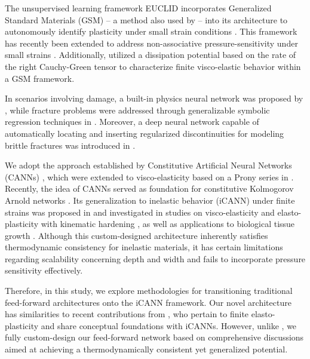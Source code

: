 The unsupervised learning framework EUCLID incorporates Generalized Standard Materials (GSM) -- a method also used by \cite{Flaschel2024convex} -- into its architecture to autonomously identify plasticity under small strain conditions \cite{flaschel2022,flaschel2023}. This framework has recently been extended to address non-associative pressure-sensitivity under small strains \cite{Xu2025}. Additionally, \cite{upadhyay2024} utilized a dissipation potential based on the rate of the right Cauchy-Green tensor to characterize finite visco-elastic behavior within a GSM framework.

In scenarios involving damage, a built-in physics neural network was proposed by \cite{TAC2024102220}, while fracture problems were addressed through generalizable symbolic regression techniques in \cite{YI2025105916}. Moreover, a deep neural network capable of automatically locating and inserting regularized discontinuities for modeling brittle fractures was introduced in \cite{Baek2024}.

We adopt the approach established by Constitutive Artificial Neural Networks (CANNs) \cite{LinkaHillgaertnerEtAl2021,LinkaKuhl2023}, which were extended to visco-elasticity based on a Prony series in \cite{AbdolaziziLinkaEtAl2023}.
Recently, the idea of CANNs served as foundation for constitutive Kolmogorov Arnold networks \cite{abdolazizi2025constitutivekolmogorovarnoldnetworksckans}.
Its generalization to inelastic behavior (iCANN) under finite strains was proposed in \cite{holthusen2023,holthusen2023PAMM} and investigated in studies on visco-elasticity and elasto-plasticity with kinematic hardening \cite{boes2024arxiv}, as well as applications to biological tissue growth \cite{holthusen2025growth}. Although this custom-designed architecture inherently satisfies thermodynamic consistency for inelastic materials, it has certain limitations regarding scalability concerning depth and width and fails to incorporate pressure sensitivity effectively. 

Therefore, in this study, we explore methodologies for transitioning traditional feed-forward architectures onto the iCANN framework. Our novel architecture has similarities to recent contributions from \citet{JADOON2025117653}, who pertain to finite elasto-plasticity and share conceptual foundations with iCANNs. However, unlike  \citet{JADOON2025117653}, we fully custom-design our feed-forward network based on comprehensive discussions aimed at achieving a thermodynamically consistent yet generalized potential.

